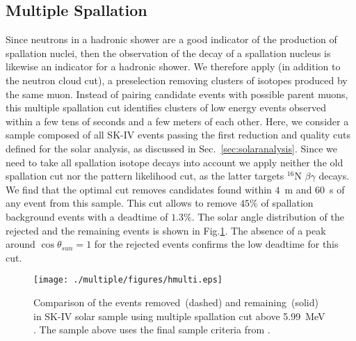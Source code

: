 \subsection{Multiple Spallation}
\label{sec:multispa}
Since neutrons in a hadronic shower are a good indicator of
the production of spallation nuclei, then the observation of the decay of a spallation nucleus is likewise an indicator for a hadronic shower. We therefore apply
(in addition to the neutron cloud cut), a preselection removing clusters of isotopes produced by the same muon. Instead of pairing candidate events with possible parent muons, this multiple spallation cut identifies clusters of low energy events observed within a few tens of seconds and a few meters of each other. Here, we consider a sample composed of all SK-IV events passing the first reduction and quality cuts defined for the solar analysis, as discussed in Sec.~\ref{sec:solaranalysis}. Since we need to take all spallation isotope decays into account we apply neither the old spallation cut nor the pattern likelihood cut, as the latter targets $\mathrm{^{16}N}$ $\beta\gamma$ decays. We find that the optimal cut removes candidates found within $4$~m and $60$~s of any event from this sample. This cut allows to remove $45\%$ of spallation background events with a deadtime of $1.3\%$. The solar angle distribution of the rejected and the remaining events is shown in Fig.\ref{fig:multispa}. The absence of a peak around $\cos\theta_{sun} = 1$ for the rejected events confirms the low deadtime for this cut.  

\begin{figure}
        \texttt{[image: ./multiple/figures/hmulti.eps]} 
    \caption{Comparison of the events removed~(dashed) and remaining~(solid) in SK-IV solar sample using multiple spallation cut above 5.99~MeV . The sample above uses the final sample criteria from \cite{skivsolar}.}
    \label{fig:multispa}
\end{figure}

\iffalse
\begin{figure}
    \centering
    \begin{subfigure}{0.5\textwidth}
    \includegraphics[width=0.5\textwidth{multiple/figures/multicut.png}
    \end{subfigure}
    \begin{subfigure}{0.5\textwidth}
    \texttt{[image: multiple/figures/nomulti.png]}
    \end{subfigure}
    \caption{Comparison of the events removed~(left) and remaining~(right) in SK-IV solar sample using multiple spallation cut above 5.5~MeV. The sample above uses the final sample criteria from~\cite{skivsolar}.}
    \label{fig:multispa}
\end{figure}
\fi

